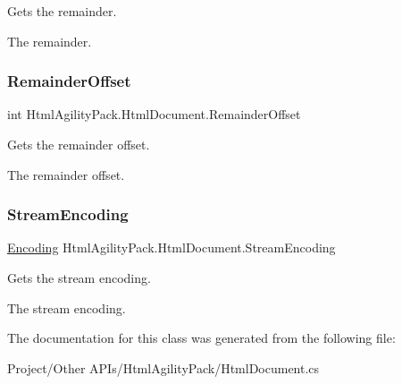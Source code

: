 Gets the remainder. 

The remainder.\mbox{\label{class_html_agility_pack_1_1_html_document_a8d46363b2c1cfa924406eb30c69fcf73}} 
\subsubsection{\texorpdfstring{Remainder\+Offset}{RemainderOffset}}
{\footnotesize\ttfamily int Html\+Agility\+Pack.\+Html\+Document.\+Remainder\+Offset\hspace{0.3cm}{\ttfamily [get]}}



Gets the remainder offset. 

The remainder offset.\mbox{\label{class_html_agility_pack_1_1_html_document_a6fb094d01a9a36494a0cbeadb80def06}} 
\subsubsection{\texorpdfstring{Stream\+Encoding}{StreamEncoding}}
{\footnotesize\ttfamily \hyperlink{class_html_agility_pack_1_1_html_document_a220bdf28a5e35f4898075084be2d59f0}{Encoding} Html\+Agility\+Pack.\+Html\+Document.\+Stream\+Encoding\hspace{0.3cm}{\ttfamily [get]}}



Gets the stream encoding. 

The stream encoding.

The documentation for this class was generated from the following file\+:\begin{DoxyCompactItemize}
\item 
Project/\+Other A\+P\+Is/\+Html\+Agility\+Pack/Html\+Document.\+cs\end{DoxyCompactItemize}
